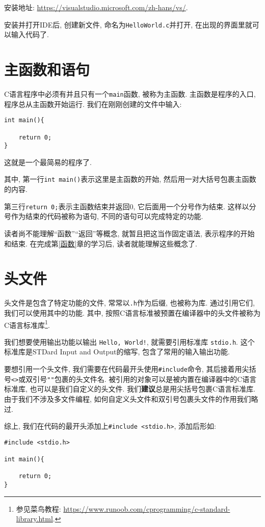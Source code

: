             安装地址: \href{https://visualstudio.microsoft.com/zh-hans/vs/}{https://visualstudio.microsoft.com/zh-hans/vs/}.

        安装并打开IDE后, 创建新文件, 命名为\texttt{HelloWorld.c}并打开, 在出现的界面里就可以输入代码了.

    \section{主函数和语句} \label{主函数和语句}
        C语言程序中必须有并且只有一个\texttt{main}函数, 被称为主函数. 主函数是程序的入口, 程序总从主函数开始运行. 我们在刚刚创建的文件中输入:
\begin{lstlisting}
int main(){

    return 0;
}
\end{lstlisting}
        这就是一个最简易的程序了.

        其中, 第一行\texttt{int main()}表示这里是主函数的开始, 然后用一对大括号包裹主函数的内容.

        第三行\texttt{return 0;}表示主函数结束并返回0, 它后面用一个分号作为结束. 这样以分号作为结束的代码被称为语句, 不同的语句可以完成特定的功能.

        读者尚不能理解``函数''``返回''等概念, 就暂且把这当作固定语法, 表示程序的开始和结束. 在完成第\ref{函数}章的学习后, 读者就能理解这些概念了.

    \section{头文件} \label{头文件}
        头文件是包含了特定功能的文件, 常常以\texttt{.h}作为后缀, 也被称为库. 通过引用它们, 我们可以使用其中的功能. 其中, 按照C语言标准被预置在编译器中的头文件被称为C语言标准库\footnote{参见菜鸟教程: \href{https://www.runoob.com/cprogramming/c-standard-library.html}{https://www.runoob.com/cprogramming/c-standard-library.html}.}.

        我们想要使用输出功能以输出 \texttt{Hello, World!}, 就需要引用标准库 \texttt{stdio.h}. 这个标准库是STDard Input and Output的缩写, 包含了常用的输入输出功能.

        要想引用一个头文件, 我们需要在代码最开头使用\texttt{\#include}命令, 其后接着用尖括号\texttt{<>}或双引号\texttt{""}包裹的头文件名. 被引用的对象可以是被内置在编译器中的C语言标准库, 也可以是我们自定义的头文件. 我们\textbf{建议}总是用尖括号包裹C语言标准库. 由于我们不涉及多文件编程, 如何自定义头文件和双引号包裹头文件的作用我们略过.

        综上, 我们在代码的最开头添加上\texttt{\#include <stdio.h>}, 添加后形如:
\begin{lstlisting}
#include <stdio.h>

int main(){

    return 0;
}
\end{lstlisting}

